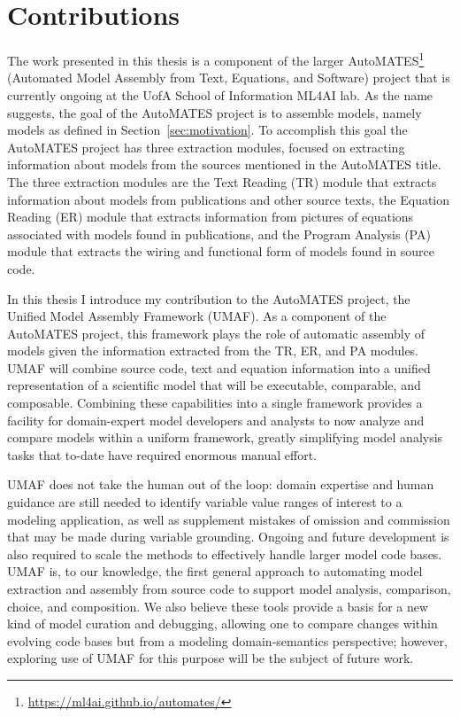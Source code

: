 \section{Contributions\label{sec:contributions}}
The work presented in this thesis is a component of the larger AutoMATES\footnote{\url{https://ml4ai.github.io/automates/}} (Automated Model Assembly from Text, Equations, and Software) project \citep{pyarelal2019} that is currently ongoing at the UofA School of Information ML4AI lab.
As the name suggests, the goal of the AutoMATES project is to assemble models, namely models as defined in Section~\ref{sec:motivation}.
To accomplish this goal the AutoMATES project has three extraction modules, focused on extracting information about models from the sources mentioned in the AutoMATES title.
The three extraction modules are the Text Reading (TR) module that extracts information about models from publications and other source texts, the Equation Reading (ER) module that extracts information from pictures of equations associated with models found in publications, and the Program Analysis (PA) module that extracts the wiring and functional form of models found in source code.

In this thesis I introduce my contribution to the AutoMATES project, the Unified Model Assembly Framework (UMAF).
As a component of the AutoMATES project, this framework plays the role of automatic assembly of models given the information extracted from the TR, ER, and PA modules.
UMAF will combine source code, text and equation information into a unified representation of a scientific model that will be executable, comparable, and composable.
Combining these capabilities into a single framework provides a facility for domain-expert model developers and analysts to now analyze and compare models within a uniform framework, greatly simplifying model analysis tasks that to-date have required enormous manual effort.

UMAF does not take the human out of the loop: domain expertise and human guidance are still needed to identify variable value ranges of interest to a modeling application, as well as supplement mistakes of omission and commission that may be made during variable grounding.
Ongoing and future development is also required to scale the methods to effectively handle larger model code bases.
UMAF is, to our knowledge, the first general approach to automating model extraction and assembly from source code to support model analysis, comparison, choice, and composition.
We also believe these tools provide a basis for a new kind of model curation and debugging, allowing one to compare changes within evolving code bases but from a modeling domain-semantics perspective; however, exploring use of UMAF for this purpose will be the subject of future work.

